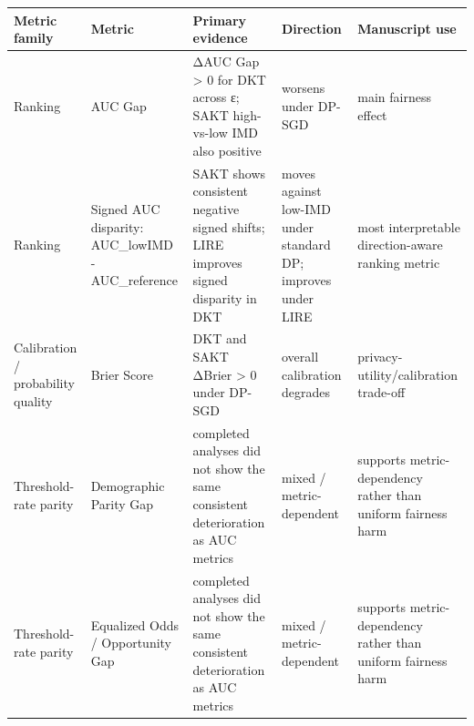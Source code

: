 \begin{tabular}{lllll}
\toprule
Metric family & Metric & Primary evidence & Direction & Manuscript use \\
\midrule
Ranking & AUC Gap & ΔAUC Gap > 0 for DKT across ε; SAKT high-vs-low IMD also positive & worsens under DP-SGD & main fairness effect \\
Ranking & Signed AUC disparity: AUC_lowIMD - AUC_reference & SAKT shows consistent negative signed shifts; LIRE improves signed disparity in DKT & moves against low-IMD under standard DP; improves under LIRE & most interpretable direction-aware ranking metric \\
Calibration / probability quality & Brier Score & DKT and SAKT ΔBrier > 0 under DP-SGD & overall calibration degrades & privacy-utility/calibration trade-off \\
Threshold-rate parity & Demographic Parity Gap & completed analyses did not show the same consistent deterioration as AUC metrics & mixed / metric-dependent & supports metric-dependency rather than uniform fairness harm \\
Threshold-rate parity & Equalized Odds / Opportunity Gap & completed analyses did not show the same consistent deterioration as AUC metrics & mixed / metric-dependent & supports metric-dependency rather than uniform fairness harm \\
\bottomrule
\end{tabular}
